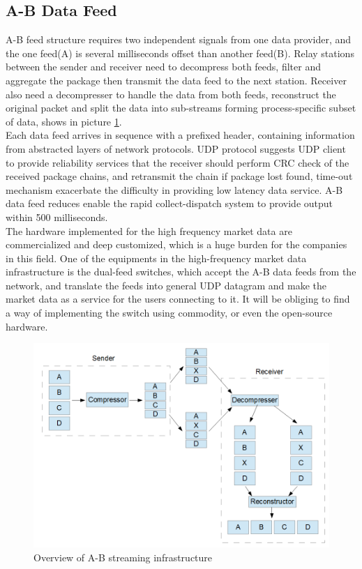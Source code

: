 \documentclass[11pt,openright,a4paper]{report}
\begin{document}
\subsection{A-B Data Feed}
A-B feed structure requires two independent signals from one data provider, and the one feed(A) is several milliseconds offset than another feed(B). Relay stations between the sender and receiver need to decompress both feeds, filter and aggregate the package then transmit the data feed to the next station. Receiver also need a decompresser to handle the data from both feeds, reconstruct the original packet and split the data into sub-streams forming process-specific subset of data, shows in picture \ref{fig:3}.\\
Each data feed arrives in sequence with a prefixed header, containing information from abstracted layers of network protocols\cite{udpprotocol}. UDP protocol suggests UDP client to provide reliability services that the receiver should perform CRC check of the received package chains, and retransmit the chain if package lost found, time-out mechanism exacerbate the difficulty in providing low latency data service. A-B data feed reduces enable the rapid collect-dispatch system to provide output within 500 milliseconds\cite{zusman1999fault}.\\
The hardware implemented for the high frequency market data are commercialized and deep customized, which is a huge burden for the companies in this field. One of the equipments in the high-frequency market data infrastructure is the dual-feed switches, which accept the A-B data feeds from the network, and translate the feeds into general UDP datagram and make the market data as a service for the users connecting to it.  It will be obliging to find a way of implementing the switch using commodity, or even the open-source hardware.\\
\begin{figure}[H]
	\centering\includegraphics[width=0.7\linewidth]{picture/A-BFeed.PNG}
	\caption{Overview of A-B streaming infrastructure}
	\label{fig:3}
\end{figure}
\end{document}
